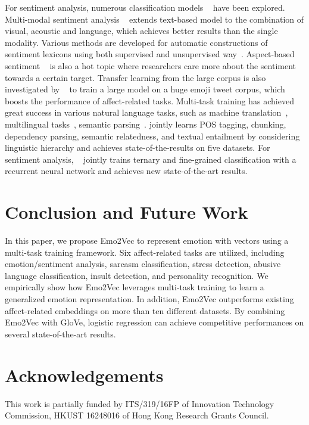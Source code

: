 \documentclass[11pt,a4paper]{article}
\begin{document}
For sentiment analysis, numerous classification models ~\cite{kalchbrennerconvolutional, iyyer2015deep, dou2017capturing} have been explored. Multi-modal sentiment analysis ~\cite{zadeh2017tensor,poria2017review} extends text-based model to the combination of visual, acoustic and language, which achieves better results than the single modality. Various methods are developed for automatic constructions of sentiment lexicons using both supervised and unsupervised way~\cite{wang2017sentiment}.  Aspect-based sentiment ~\cite{chen2017recurrent,wang2016attention} is also a hot topic where researchers care more about the sentiment towards a certain target. Transfer learning from the large corpus is also investigated by ~ to train a large model on a huge emoji tweet corpus, which boosts the performance of affect-related tasks. Multi-task training has achieved great success in various natural language tasks, such as machine translation~\cite{dong2015multi, malaviya2017learning}, multilingual tasks~\cite{duong2015low,gillick2016multilingual}, semantic parsing~\cite{peng2017deep}.  jointly learns POS tagging, chunking, dependency parsing, semantic relatedness, and textual entailment by considering linguistic hierarchy and achieves state-of-the-results on five datasets.  For sentiment analysis, ~ jointly trains ternary and fine-grained classification with a recurrent neural network and achieves new  state-of-the-art results. 
 

\section{Conclusion and Future Work}


In this paper, we propose Emo2Vec to represent emotion with vectors using a multi-task training framework. Six affect-related tasks are utilized, including  emotion/sentiment analysis, sarcasm classification, stress detection, abusive language classification, insult detection, and personality recognition. We empirically show how Emo2Vec leverages multi-task training to learn a generalized emotion representation. In addition, Emo2Vec outperforms existing affect-related embeddings on more than ten different datasets. By combining Emo2Vec with GloVe, logistic regression can achieve competitive performances on several state-of-the-art results.

\section{Acknowledgements}

This work is partially funded by ITS/319/16FP of Innovation Technology Commission, HKUST 16248016 of Hong Kong Research Grants Council.














\appendix

\newpage
\newpage
\clearpage
\end{document}
